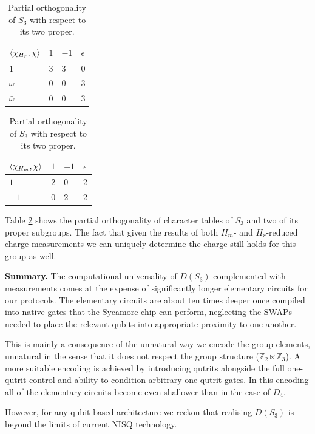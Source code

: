 \documentclass[two column]{article}
\begin{document}
\begin{table}[h]
\centering
\begin{tabular}{|l|lll|}\hline
  $\braket{\chi_{H_r}, \chi}$ & $1$ & $-1$ & $\epsilon$  \\ \hline
$1$ & 3   & 3            & 0                             \\ 
$\omega$ & 0   & 0            & 3                              \\ 
$\bar{\omega}$ & 0   & 0            & 3                          \\ \hline
\end{tabular}

\begin{tabular}{|l|lll|}\hline
  $\braket{\chi_{H_m}, \chi}$ & $1$ & $-1$ & $\epsilon$  \\ \hline
$1$ & 2   & 0            & 2                             \\ 
$-1$ & 0   & 2            & 2                              \\ \hline

\end{tabular}
\caption{Partial orthogonality of $S_3$ with respect to its two proper.}
\label{tab:red_ch_S3}
\end{table}

Table \ref{tab:red_ch_S3} shows the partial orthogonality of character tables of $S_3$ and two of its proper subgroups. The fact that given the results of both $H_m$- and $H_r$-reduced charge measurements we can uniquely determine the charge still holds for this group as well. 

\textbf{Summary.}
The computational universality of $D(S_3)$ complemented with measurements comes at the expense of significantly longer elementary circuits for our protocols. The elementary circuits are about ten times deeper once compiled into native gates that the Sycamore chip can perform, neglecting the SWAPs needed to place the relevant qubits into appropriate proximity to one another.

This is mainly a consequence of the unnatural way we encode the group elements, unnatural in the sense that it does not respect the group structure ($\mathbb{Z}_2 \ltimes \mathbb{Z}_3$). A more suitable encoding is achieved by introducing qutrits alongside the full one-qutrit control and ability to condition arbitrary one-qutrit gates. In this encoding all of the elementary circuits become even shallower than in the case of $D_4$. 

However, for any qubit based architecture we reckon that realising $D(S_3)$ is beyond the limits of current NISQ technology.
\end{document}
